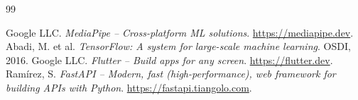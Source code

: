 \documentclass[12pt,fleqn,a4paper]{report}
\begin{document}
\normalsize
\begin{thebibliography}{99}
Google LLC. \textit{MediaPipe – Cross-platform ML solutions}. \url{https://mediapipe.dev}.
Abadi, M. et al. \textit{TensorFlow: A system for large-scale machine learning}. OSDI, 2016.
Google LLC. \textit{Flutter – Build apps for any screen}. \url{https://flutter.dev}.
Ramírez, S. \textit{FastAPI – Modern, fast (high-performance), web framework for building APIs with Python}. \url{https://fastapi.tiangolo.com}.
\end{thebibliography}
\end{document}
